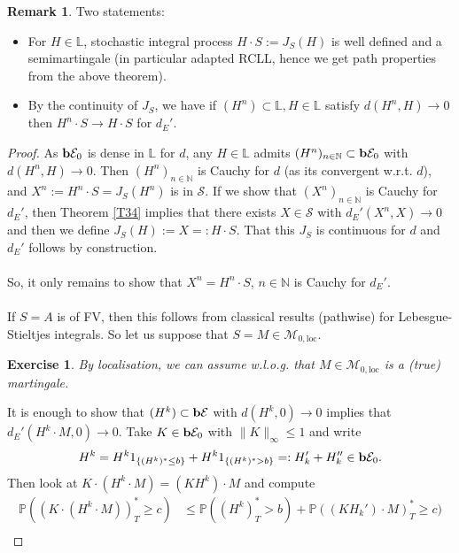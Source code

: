 \documentclass[12pt,a4paper, twoside]{article}
\newtheorem{exe}{Exercise}[section]
\theoremstyle{definition}
\newtheorem{rem}{Remark}[section]
\newcommand{\PP}{\mathbb{P}} %
\newcommand{\simple}{\textbf{\text{b}}\mathcal{E}}
\begin{document}
\begin{rem} Two statements:
\begin{itemize}
\item For $H \in \mathbb{L}$, stochastic integral process $H \cdot S:= J_S(H)$ is well defined and a semimartingale (in particular adapted RCLL, hence we get path properties from the above theorem).
\item By the continuity of $J_S$, we have if $(H^n) \subset \mathbb{L},  H \in \mathbb{L}$ satisfy $d(H^n, H) \to 0$ then $H^n \cdot S \to H \cdot S$ for $d_E'$.
\end{itemize}
\end{rem}
\newpage
\begin{proof}
As $\simple_0$ is dense in $\mathbb{L}$ for $d$, any $H \in \mathbb{L}$ admits $(H^n)_{n \in \mathbb{N}} \subset \simple_0$ with $d(H^n, H) \to 0$. Then $(H^n)_{n \in \mathbb{N}}$ is Cauchy for $d$ (as its convergent w.r.t. $d$), and $X^n := H^n \cdot S = J_S(H^n)$ is in $\mathcal{S}$. If we show that $(X^n)_{n \in \mathbb{N}}$ is Cauchy for $d_E'$, then Theorem \ref{T34} implies that there exists $X \in \mathcal{S}$ with $d_E'(X^n,X) \to 0$ and then we define $J_S(H):= X=: H \cdot S$. That this $J_S$ is continuous for $d$ and $d_E'$ follows by construction.
\\\\
So,  it only remains to show that $X^n = H^n \cdot S$, $n \in \mathbb{N}$ is Cauchy for $d_E'$. 
\\\\
If $S=A$ is of FV, then this follows from classical results (pathwise) for Lebesgue-Stieltjes integrals. So let us suppose that $S=M \in \mathcal{M}_{0, \text{loc}}$. 
\begin{exe} \label{ex10} By localisation, we can assume w.l.o.g. that $M \in \mathcal{M}_{0, \text{loc}}$ is a (true) martingale. 
\end{exe}
It is enough to show that $(H^k) \subset \simple$ with $d(H^k,0) \to 0$ implies that \\ $d_E'( H^k \cdot M, 0) \to 0$. Take $K \in \simple_0$ with $\|K\|_\infty \leq 1$ and write 
\begin{align*}
H^k = H^k 1_{\{ (H^k)^* \leq b \}} + H^k1_{\{ (H^k)^* > b\}} =: H_k' + H_k'' \in \simple_0.
\end{align*}
Then look at $K \cdot (H^k \cdot M) = (KH^k) \cdot M$ and compute
\begin{align*}
\PP((K \cdot (H^k \cdot M))_T^* \geq c) &\leq \PP((H^k)_T^* > b) + \PP((KH_k') \cdot M)_T^* \geq c) \\

\end{align*}
\end{proof}
\end{document}
